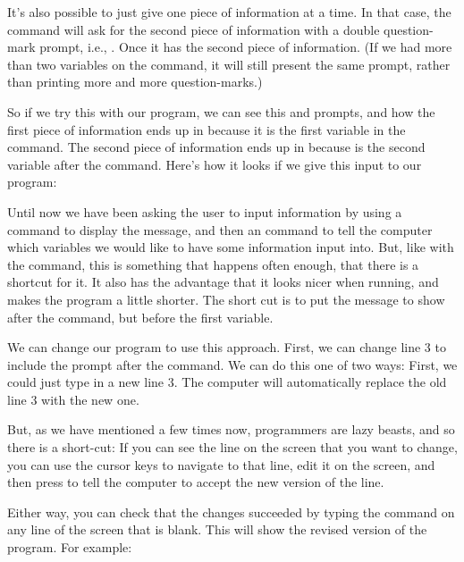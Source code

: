 It's also possible to just give one piece of information at a time.
In that case, the  command will ask for the second piece
of information with a double question-mark prompt, i.e., .
Once it has the second piece of information.  (If we had more than
two variables on the  command, it will still present the
same  prompt, rather than printing more and more
question-marks.)

\needspace{4cm}
So if we try this with our program, we can see this  and
 prompts, and how the first piece of information ends up in
 because it is the first variable in the 
command.
The second piece of information ends up in  because  is
the second variable after the  command. Here's how it
looks if we give this input to our program:



Until now we have been asking the user to input information by using a
 command to display the message, and then an 
command to tell the computer which variables we would like to have
some information input into.  But, like with the  command,
this is something that happens often enough, that there is a shortcut
for it. It also has the advantage that it looks nicer when
running, and makes the program a little shorter. The short cut is to
put the message to show after the  command, but before the
first variable.

We can change our program to use this approach.  First, we can
change line 3 to include the prompt after the  command.  We
can do this one of two ways: First, we could just type in a new line
3. The computer will automatically replace the old line 3 with the new
one.

But, as we have mentioned a few times now, programmers are lazy
beasts, and so there is a short-cut: If you can see the line on the
screen that you want to change, you can use the cursor keys to
navigate to that line, edit it on the screen, and then press
 to tell the computer to accept the new version
of the line.

\needspace{4cm}
Either way, you
can check that the changes succeeded by typing the  command
on any line of the screen that is blank.  This will show the revised
version of the program.  For example:

